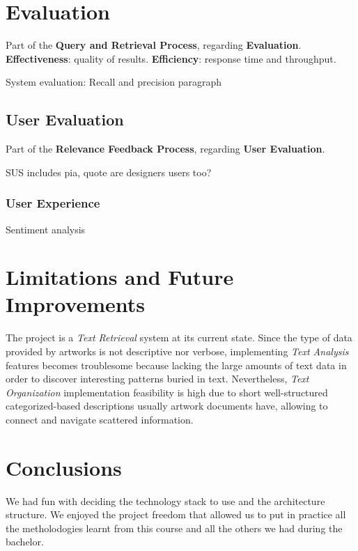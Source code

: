 \documentclass[12pt]{spieman}  %
\begin{document}
\begin{spacing}{1}
    \section{Evaluation}\label{sec:evaluation}
    Part of the \textbf{Query and Retrieval Process}, regarding \textbf{Evaluation}.\\

    \textbf{Effectiveness}: quality of results. \textbf{Efficiency}: response time and throughput.

    System evaluation: Recall and precision paragraph

    \subsection{User Evaluation}
    Part of the \textbf{Relevance Feedback Process}, regarding \textbf{User Evaluation}.

    SUS includes pia, quote are designers users too?

    \subsubsection{User Experience}\label{sec:ux}
    Sentiment analysis


    \section{Limitations and Future Improvements}

    The project is a \textit{Text Retrieval} system at its current state.
    Since the type of data provided by artworks is not descriptive nor verbose,
    implementing \textit{Text Analysis} features becomes troublesome because lacking the large amounts of
    text data in order to discover interesting patterns buried in text.
    Nevertheless, \textit{Text Organization} implementation feasibility is high due to
    short well-structured categorized-based descriptions usually artwork documents have,
    allowing to connect and navigate scattered information.

    \section{Conclusions}
    We had fun with deciding the technology stack to use and the architecture structure.
    We enjoyed the project freedom that allowed us to put in practice all the metholodogies
    learnt from this course and all the others we had during the bachelor.


\end{spacing}
\end{document}
